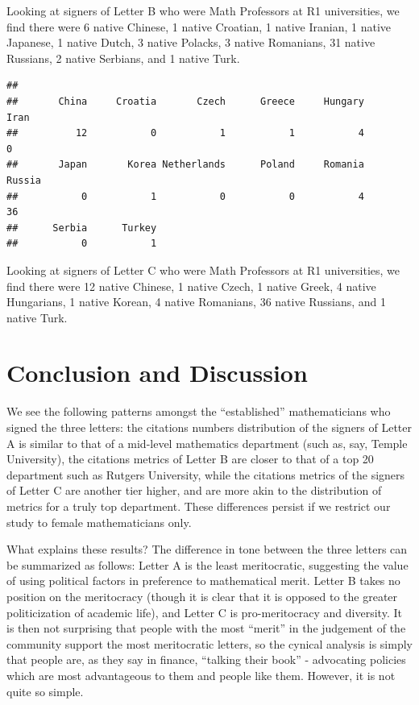 \documentclass[]{article}
\newenvironment{Shaded}{\begin{snugshade}}{\end{snugshade}}
\newcommand{\KeywordTok}[1]{\textcolor[rgb]{0.13,0.29,0.53}{\textbf{#1}}}
\newcommand{\NormalTok}[1]{#1}
\newcommand{\OperatorTok}[1]{\textcolor[rgb]{0.81,0.36,0.00}{\textbf{#1}}}
\newcommand{\StringTok}[1]{\textcolor[rgb]{0.31,0.60,0.02}{#1}}
\begin{document}
Looking at signers of Letter B who were Math Professors at R1
universities, we find there were 6 native Chinese, 1 native Croatian, 1
native Iranian, 1 native Japanese, 1 native Dutch, 3 native Polacks, 3
native Romanians, 31 native Russians, 2 native Serbians, and 1 native
Turk.

\begin{Shaded}
\end{Shaded}

\begin{verbatim}
## 
##       China     Croatia       Czech      Greece     Hungary        Iran 
##          12           0           1           1           4           0 
##       Japan       Korea Netherlands      Poland     Romania      Russia 
##           0           1           0           0           4          36 
##      Serbia      Turkey 
##           0           1
\end{verbatim}

Looking at signers of Letter C who were Math Professors at R1
universities, we find there were 12 native Chinese, 1 native Czech, 1
native Greek, 4 native Hungarians, 1 native Korean, 4 native Romanians,
36 native Russians, and 1 native Turk.

\hypertarget{conclusion-and-discussion}{%
\section{Conclusion and Discussion}\label{conclusion-and-discussion}}

We see the following patterns amongst the ``established'' mathematicians
who signed the three letters: the citations numbers distribution of the
signers of Letter A is similar to that of a mid-level mathematics
department (such as, say, Temple University), the citations metrics of
Letter B are closer to that of a top 20 department such as Rutgers
University, while the citations metrics of the signers of Letter C are
another tier higher, and are more akin to the distribution of metrics
for a truly top department. These differences persist if we restrict our
study to female mathematicians only.

What explains these results? The difference in tone between the three
letters can be summarized as follows: Letter A is the least
meritocratic, suggesting the value of using political factors in
preference to mathematical merit. Letter B takes no position on the
meritocracy (though it is clear that it is opposed to the greater
politicization of academic life), and Letter C is pro-meritocracy and
diversity. It is then not surprising that people with the most ``merit''
in the judgement of the community support the most meritocratic letters,
so the cynical analysis is simply that people are, as they say in
finance, ``talking their book'' - advocating policies which are most
advantageous to them and people like them. However, it is not quite so
simple.
\end{document}
